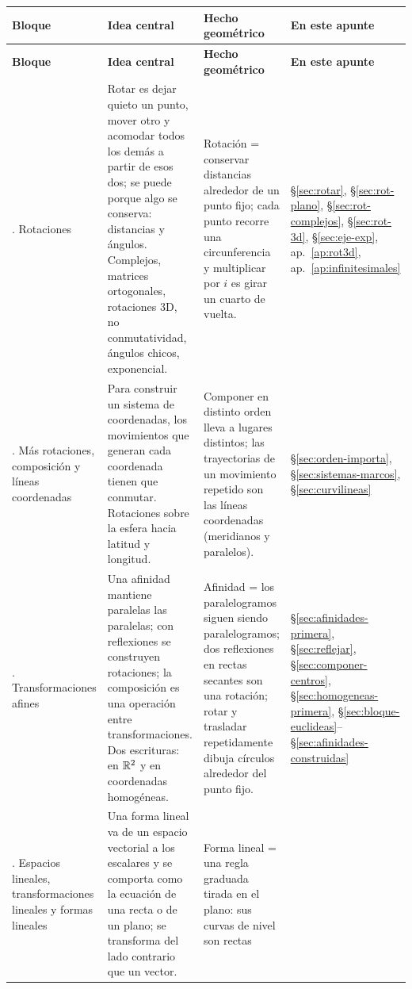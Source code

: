 {\small
\begin{longtable}{>{\raggedright\arraybackslash}p{20mm}>{\raggedright\arraybackslash}p{60mm}>{\raggedright\arraybackslash}p{44mm}>{\raggedright\arraybackslash}p{28mm}}
\toprule
\textbf{Bloque} & \textbf{Idea central} & \textbf{Hecho geométrico} &
\textbf{En este apunte}\\
\midrule
\endfirsthead
\toprule
\textbf{Bloque} & \textbf{Idea central} & \textbf{Hecho geométrico} &
\textbf{En este apunte}\\
\midrule
\endhead
\bottomrule
\endlastfoot
1. Rotaciones &
Rotar es dejar quieto un punto, mover otro y acomodar todos los demás a partir de esos dos;
se puede porque algo se conserva: distancias y ángulos. Complejos, matrices ortogonales,
rotaciones 3D, no conmutatividad, ángulos chicos, exponencial. &
Rotación = conservar distancias alrededor de un punto fijo; cada punto recorre una
circunferencia y multiplicar por \(i\) es girar un cuarto de vuelta. &
\S\ref{sec:rotar}, \S\ref{sec:rot-plano}, \S\ref{sec:rot-complejos}, \S\ref{sec:rot-3d},
\S\ref{sec:eje-exp}, ap.~\ref{ap:rot3d}, ap.~\ref{ap:infinitesimales}\\
2. Más rotaciones, composición y líneas coordenadas &
Para construir un sistema de coordenadas, los movimientos que generan cada coordenada
tienen que conmutar. Rotaciones sobre la esfera hacia latitud y
longitud. &
Componer en distinto orden lleva a lugares distintos; las trayectorias de un movimiento
repetido son las líneas coordenadas (meridianos y paralelos). &
\S\ref{sec:orden-importa}, \S\ref{sec:sistemas-marcos}, \S\ref{sec:curvilineas}\\
3. Transformaciones afines &
Una afinidad mantiene paralelas las paralelas; con reflexiones se construyen rotaciones;
la composición es una operación entre transformaciones. Dos escrituras: en \(\mathbb{R}^2\) y en
coordenadas homogéneas. &
Afinidad = los paralelogramos siguen siendo paralelogramos; dos reflexiones en rectas
secantes son una rotación; rotar y trasladar repetidamente dibuja círculos alrededor del
punto fijo. &
\S\ref{sec:afinidades-primera}, \S\ref{sec:reflejar}, \S\ref{sec:componer-centros},
\S\ref{sec:homogeneas-primera}, \S\ref{sec:bloque-euclideas}--\S\ref{sec:afinidades-construidas}\\
4. Espacios lineales, transformaciones lineales y formas lineales &
Una forma lineal va de un espacio vectorial a los escalares y se comporta como la ecuación
de una recta o de un plano; se transforma del lado contrario que un vector. &
Forma lineal = una regla graduada tirada en el plano: sus curvas de nivel son rectas

\end{longtable}}
